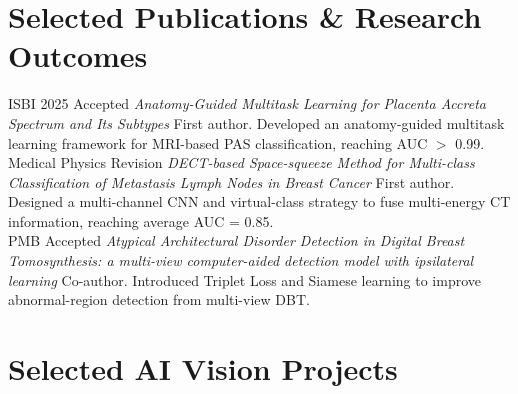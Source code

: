 \documentclass[letterpaper]{DS_class_file} %
\begin{document}
\newpage
\makeseconda %


\section{Selected Publications \& Research Outcomes}

\begin{twenty}
	\twentyitem
	{ISBI 2025}
	{Accepted}
	{\textit{Anatomy-Guided Multitask Learning for Placenta Accreta Spectrum and Its Subtypes}}
	{}
	{}
	{First author. Developed an anatomy-guided multitask learning framework for MRI-based PAS classification, reaching AUC $>$ 0.99.}
	\\
	\twentyitem
	{Medical Physics}
	{Revision}
	{\textit{DECT-based Space-squeeze Method for Multi-class Classification of Metastasis Lymph Nodes in Breast Cancer}}
	{}
	{}
	{First author. Designed a multi-channel CNN and virtual-class strategy to fuse multi-energy CT information, reaching average AUC = 0.85.}
	\\
	\twentyitem
	{PMB}
	{Accepted}
	{\textit{Atypical Architectural Disorder Detection in Digital Breast Tomosynthesis: a multi-view computer-aided detection model with ipsilateral learning}}
	{}
	{}
	{Co-author. Introduced Triplet Loss and Siamese learning to improve abnormal-region detection from multi-view DBT.}
\end{twenty}

\vspace{1cm}
\section{Selected AI Vision Projects}
\end{document}
